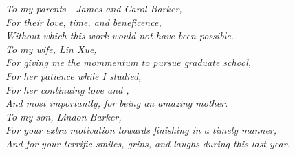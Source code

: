\documentclass[phd,tocprelim,draft]{cornell}
\begin{document}
\begin{dedication}
\begin{center}
\textit{To my parents---James and Carol Barker, \\
For their love, time, and beneficence, \\
Without which this work would not have been possible. \\
\vspace{10 mm} 
To my wife, Lin Xue, \\
For giving me the mommentum to pursue graduate school, \\
For her patience while I studied, \\
For her continuing love and , \\
And most importantly, for being an amazing mother.\\
\vspace{10 mm} 
To my son, Lindon Barker, \\
For your extra motivation towards finishing in a timely manner, \\
And for your terrific smiles, grins, and laughs during this last year.}
\end{center}
\end{dedication}
\end{document}
